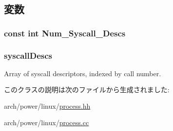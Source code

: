 \subsection{変数}
\hypertarget{classPowerLinuxProcess_a9534988905c6f5c8c57c4b6a7b179fea}{
\subsubsection[{Num\_\-Syscall\_\-Descs}]{\setlength{\rightskip}{0pt plus 5cm}const int {\bf Num\_\-Syscall\_\-Descs}}}
\label{classPowerLinuxProcess_a9534988905c6f5c8c57c4b6a7b179fea}
\hypertarget{classPowerLinuxProcess_a08d67a94820b75842e07f030e548372e}{
\subsubsection[{syscallDescs}]{ {\bf syscallDescs}}}
\label{classPowerLinuxProcess_a08d67a94820b75842e07f030e548372e}


Array of syscall descriptors, indexed by call number. 

このクラスの説明は次のファイルから生成されました:\begin{DoxyCompactItemize}
\item 
arch/power/linux/\hyperlink{arch_2power_2linux_2process_8hh}{process.hh}\item 
arch/power/linux/\hyperlink{arch_2power_2linux_2process_8cc}{process.cc}\end{DoxyCompactItemize}
